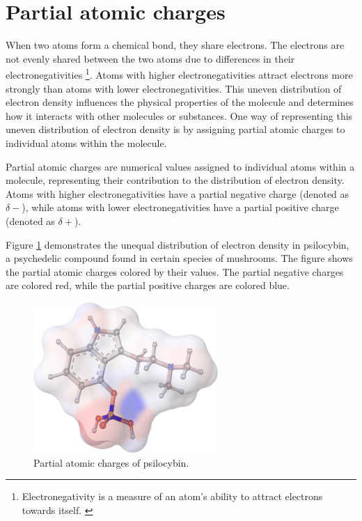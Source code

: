 \documentclass[
  digital,     %
  oneside,     %
  nosansbold,  %
  nocolorbold, %
  lof,         %
  lot,         %
]{fithesis4}
\begin{document}
\section{Partial atomic charges}
\label{section:partial_atomic_charges}

When two atoms form a chemical bond, they share electrons. The electrons are not evenly shared between the two atoms due to differences in their electronegativities \footnote[1]{Electronegativity is a measure of an atom's ability to attract electrons towards itself. \cite{racek2022thesis}}. Atoms with higher electronegativities attract electrons more strongly than atoms with lower electronegativities. This uneven distribution of electron density influences the physical properties of the molecule and determines how it interacts with other molecules or substances. One way of representing this uneven distribution of electron density is by assigning partial atomic charges to individual atoms within the molecule. \cite{racek2022thesis,schindler2019thesis}

Partial atomic charges are numerical values assigned to individual atoms within a molecule, representing their contribution to the distribution of electron density. Atoms with higher electronegativities have a partial negative charge (denoted as $\delta-$), while atoms with lower electronegativities have a partial positive charge (denoted as $\delta+$). \cite{racek2022thesis} 

Figure \ref{fig:psilocybin} demonstrates the unequal distribution of electron density in psilocybin, a psychedelic compound found in certain species of mushrooms. \cite{tysl2014psilocybin} The figure shows the partial atomic charges colored by their values. The partial negative charges are colored red, while the partial positive charges are colored blue.

\begin{figure}[htbp]
  \begin{center}
    \includegraphics[width=7cm]{figures/psilocybine.png}
  \end{center}
  \caption{Partial atomic charges of psilocybin.}
  \label{fig:psilocybin}
\end{figure}
\end{document}
